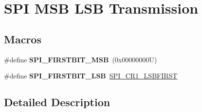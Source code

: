 \hypertarget{group___s_p_i___m_s_b___l_s_b__transmission}{}\section{S\+PI M\+SB L\+SB Transmission}
\label{group___s_p_i___m_s_b___l_s_b__transmission}
\subsection*{Macros}
\begin{DoxyCompactItemize}
\item 
\mbox{\label{group___s_p_i___m_s_b___l_s_b__transmission_ga2280ac1a6ed587b516419b5df6a8ea55}} 
\#define {\bfseries S\+P\+I\+\_\+\+F\+I\+R\+S\+T\+B\+I\+T\+\_\+\+M\+SB}~(0x00000000\+U)
\item 
\mbox{\label{group___s_p_i___m_s_b___l_s_b__transmission_ga8b608690a1adf9df40f271c228a479a3}} 
\#define {\bfseries S\+P\+I\+\_\+\+F\+I\+R\+S\+T\+B\+I\+T\+\_\+\+L\+SB}~\mbox{\hyperlink{group___peripheral___registers___bits___definition_gab929e9d5ddbb66f229c501ab18d0e6e8}{S\+P\+I\+\_\+\+C\+R1\+\_\+\+L\+S\+B\+F\+I\+R\+ST}}
\end{DoxyCompactItemize}


\subsection{Detailed Description}
